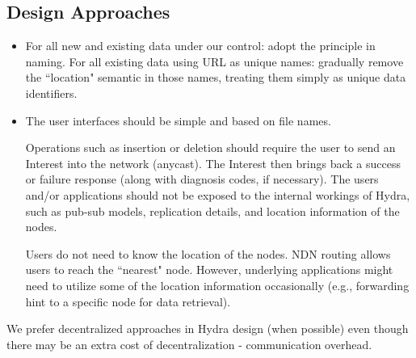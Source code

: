 \subsection{Design Approaches} \label{subsec:design-approach}

\begin{itemize}
\item For all new and existing data under our control: adopt the principle in naming.
For all existing data using URL as unique names: gradually remove the ``location" semantic in those names, treating them simply as unique data identifiers.

\item The user interfaces should be simple and based on file names. 
 
    Operations such as insertion or deletion should require the user to send an Interest into the network (anycast). The Interest then brings back a success or failure response (along with diagnosis codes, if necessary). The users and/or applications should not be exposed to the internal workings of Hydra, such as pub-sub models, replication details, and location information of the nodes. 
    
    Users do not need to know the location of the nodes. NDN routing allows users to reach the ``nearest" node. However, underlying applications might need to utilize some of the location information occasionally (e.g., forwarding hint to a specific node for data retrieval).
\end{itemize}

We prefer decentralized approaches in Hydra design (when possible) even though there may be an extra cost of decentralization - communication overhead.
